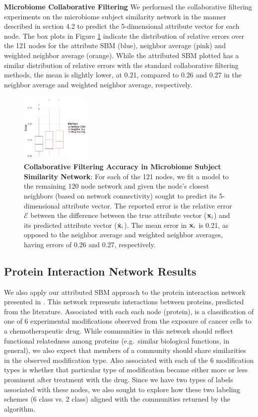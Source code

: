 \documentclass[10pt,journal,compsoc]{IEEEtran}
\begin{document}
{\bf Microbiome Collaborative Filtering}
We performed the collaborative filtering experiments on the microbiome subject similarity network in the manner described in section 4.2 to predict the 5-dimensional attribute vector for each node. The box plots in Figure \ref{Fig6} indicate the distribution of relative errors over the 121 nodes for the attribute SBM (blue), neighbor average (pink) and weighted neighbor average (orange). While the attributed SBM plotted has a similar distribution of relative errors with the standard collaborative filtering methods, the mean is slightly lower, at 0.21, compared to 0.26 and 0.27 in the neighbor average and weighted neighbor average, respectively.
\begin{figure}[h!]
\begin{center}
\includegraphics[width=0.3\textwidth]{CollabFilterMicro.pdf}
\caption{{\bf Collaborative Filtering Accuracy in Microbiome Subject Similarity Network}: For each of the 121 nodes, we fit a model to the remaining 120 node network and given the node's closest  neighbors (based on network connectivity) sought to predict its 5-dimensional attribute vector. The reported error is the relative error $\mathcal{E}$ between the difference between the true attribute vector (${\bf x}_{i}$) and its predicted attribute vector (${\hat{\bf x}}_{i}$). The mean error in ${\bf x}_{i}$ is 0.21, as opposed to the neighbor average and weighted neighbor averages, having errors of 0.26 and 0.27, respectively. }
\label{Fig6}
\end{center}
\end{figure}

\subsection{Protein Interaction Network Results}
We also apply our attributed SBM approach to the protein interaction network presented in \cite{bonacci}. This network represents interactions between proteins, predicted from the literature. Associated with each each node (protein), is a classification of one of 6 experimental modifications observed from the exposure of cancer cells to a chemotherapeutic drug. While communities in this network should reflect functional relatedness among proteins (e.g.\ similar biological functions, in general), we also expect that members of a community should share similarities in the observed modification type. Also associated with each of the 6 modification types is whether that particular type of modification became either more or less prominent after treatment with the drug. Since we have two types of labels associated with these nodes, we also sought to explore how these two labeling schemes (6 class vs. 2 class) aligned with the communities returned by the algorithm. 
\end{document}
